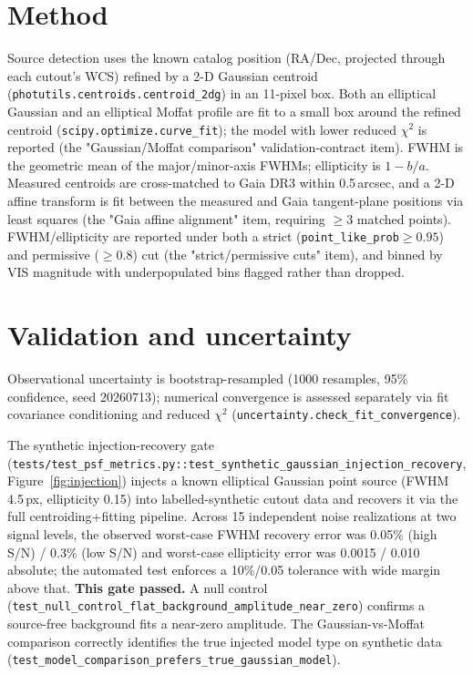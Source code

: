 \documentclass[11pt]{article}
\begin{document}
\section{Method}
Source detection uses the known catalog position (RA/Dec, projected through
each cutout's WCS) refined by a 2-D Gaussian centroid
(\texttt{photutils.centroids.centroid\_2dg}) in an 11-pixel box. Both an
elliptical Gaussian and an elliptical Moffat profile are fit to a small box
around the refined centroid (\texttt{scipy.optimize.curve\_fit}); the model
with lower reduced $\chi^2$ is reported (the "Gaussian/Moffat comparison"
validation-contract item). FWHM is the geometric mean of the major/minor-axis
FWHMs; ellipticity is $1 - b/a$. Measured centroids are cross-matched to Gaia
DR3 within 0.5\,arcsec, and a 2-D affine transform is fit between the
measured and Gaia tangent-plane positions via least squares (the "Gaia affine
alignment" item, requiring $\geq 3$ matched points). FWHM/ellipticity are
reported under both a strict (\texttt{point\_like\_prob}$\geq 0.95$) and
permissive ($\geq 0.8$) cut (the "strict/permissive cuts" item), and binned
by VIS magnitude with underpopulated bins flagged rather than dropped.

\section{Validation and uncertainty}
\label{sec:validation}
Observational uncertainty is bootstrap-resampled (1000 resamples, 95\%
confidence, seed 20260713); numerical convergence is assessed separately via
fit covariance conditioning and reduced $\chi^2$
(\texttt{uncertainty.check\_fit\_convergence}).

The synthetic injection-recovery gate
(\texttt{tests/test\_psf\_metrics.py::test\_synthetic\_gaussian\_injection\_recovery},
Figure~\ref{fig:injection}) injects a known elliptical Gaussian point source
(FWHM 4.5\,px, ellipticity 0.15) into labelled-synthetic cutout data and
recovers it via the full centroiding+fitting pipeline. Across 15 independent
noise realizations at two signal levels, the observed worst-case FWHM
recovery error was 0.05\% (high S/N) / 0.3\% (low S/N) and worst-case
ellipticity error was 0.0015 / 0.010 absolute; the automated test enforces a
10\%/0.05 tolerance with wide margin above that. \textbf{This gate passed.}
A null control
(\texttt{test\_null\_control\_flat\_background\_amplitude\_near\_zero})
confirms a source-free background fits a near-zero amplitude. The
Gaussian-vs-Moffat comparison correctly identifies the true injected model
type on synthetic data
(\texttt{test\_model\_comparison\_prefers\_true\_gaussian\_model}).
\end{document}
